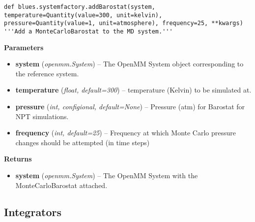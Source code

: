\begin{description}
\begin{verbatim}
def blues.systemfactory.addBarostat(system, temperature=Quantity(value=300, unit=kelvin), pressure=Quantity(value=1, unit=atmosphere), frequency=25, **kwargs)
'''Add a MonteCarloBarostat to the MD system.'''
\end{verbatim}


\begin{description}
\item
    \textbf{Parameters}
\begin{itemize}
\item
  \textbf{system} (\emph{openmm.System}) -- The OpenMM System object
  corresponding to the reference system.
\item
  \textbf{temperature} (\emph{float, default=300}) -- temperature
  (Kelvin) to be simulated at.
\item
  \textbf{pressure} (\emph{int, configional, default=None}) -- Pressure
  (atm) for Barostat for NPT simulations.
\item
  \textbf{frequency} (\emph{int, default=25}) -- Frequency at which
  Monte Carlo pressure changes should be attempted (in time steps)
\end{itemize}
\item
    \textbf{Returns}
\begin{itemize}
    \item
        \textbf{system} (\emph{openmm.System}) -- The OpenMM System with the MonteCarloBarostat attached.
\end{itemize}
\end{description}
\end{description}

\hypertarget{integrators}{%
\subsection{Integrators}\label{integrators}}

